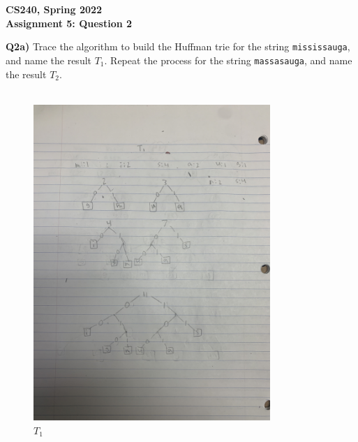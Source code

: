 \documentclass[12pt]{article}
\begin{document}
\begin{center}
{\Large\textbf{CS240, Spring 2022}}\\
\vspace{2mm}
{\Large\textbf{Assignment 5: Question 2}}\\
\vspace{3mm}
\end{center}

\begin{adjustwidth}{0em}{0pt}
\textbf{Q2a)} Trace the algorithm to build the Huffman trie for the string {\tt mississauga}, and name the result $T_1$. Repeat the process for the string {\tt massasauga}, and name the result $T_2$.\\\\
\begin{figure}[tbhp]
	\begin{center}
		\includegraphics[width=0.8\textwidth, angle=270]{t1.jpg}
	\end{center}
	\caption{$T_1$}
	\label{figcaption}
\end{figure}
\begin{figure}[tbhp]
	\begin{center}

\end{center}
\end{figure}
\end{adjustwidth}
\end{document}
